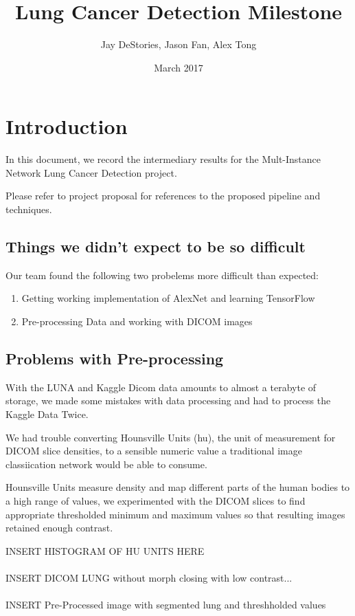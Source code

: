 \documentclass[twocolumn,10pt]{article}
\title{Lung Cancer Detection Milestone}
\author{Jay DeStories, Jason Fan, Alex Tong}
\date{March 2017}
\newcommand{\red}[1]{{\color{red}#1}}
\newcommand{\temp}[1]{{\red{#1}\\}}
\begin{document}
\maketitle
\section{Introduction}

In this document, we record the intermediary results for the Mult-Instance
Network Lung Cancer Detection project.

Please refer to project proposal for references to the proposed pipeline and
techniques.

\subsection{Things we didn't expect to be so difficult}

Our team found the following two probelems more difficult than expected:
\begin{enumerate}[noitemsep]
  \item Getting working implementation of AlexNet and learning TensorFlow
  \item Pre-processing Data and working with DICOM images
\end{enumerate}

\subsection{Problems with Pre-processing}

With the LUNA and Kaggle Dicom data amounts to almost a terabyte of storage, we
made some mistakes with data processing and had to process the Kaggle Data Twice.

We had trouble converting Hounsville Units (hu), the unit of measurement for DICOM
slice densities, to a sensible numeric value a traditional image classiication 
network would be able to consume. 

Hounsville Units measure density and map different parts of the human bodies to
a high range of values, we experimented with the DICOM slices to find appropriate
thresholded minimum and maximum values so that resulting images retained enough
contrast.

\temp{INSERT HISTOGRAM OF HU UNITS HERE}\\
\temp{INSERT DICOM LUNG without morph closing with low contrast...}\\
\temp{INSERT Pre-Processed image with segmented lung and threshholded values}\\
\end{document}
